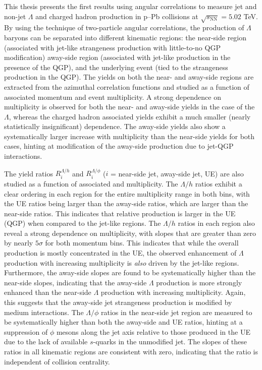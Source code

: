 This thesis presents the first results using angular correlations to measure jet and non-jet $\Lambda$ and charged hadron production in p--Pb collisions at $\sqrt{s_{\text{NN}}} = 5.02$ TeV. By using the technique of two-particle angular correlations, the production of $\Lambda$ baryons can be separated into different kinematic regions: the near-side region (associated with jet-like strangeness production with little-to-no QGP modification) away-side region (associated with jet-like production in the presence of the QGP), and the underlying event (tied to the strangeness production in the QGP). The yields on both the near- and away-side regions are extracted from the azimuthal correlation functions and studied as a function of associated momentum and event multiplicity. A strong dependence on multiplicity is observed for both the near- and away-side yields in the case of the $\Lambda$, whereas the charged hadron associated yields exhibit a much smaller (nearly statistically insignificant) dependence. The away-side yields also show a systematically larger increase with multiplicity than the near-side yields for both cases, hinting at modification of the away-side production due to jet-QGP interactions. 

The yield ratios $R_{i}^{\Lambda/h}$ and $R_{i}^{\Lambda/\phi}$ ($i$ = near-side jet, away-side jet, UE) are also studied as a function of associated \pt and multiplicity. The $\Lambda/h$ ratios exhibit a clear ordering in each region for the entire multiplicity range in both \pt bins, with the UE ratios being larger than the away-side ratios, which are larger than the near-side ratios. This indicates that relative \lmb production is larger in the UE (QGP) when compared to the jet-like regions. The $\Lambda/h$ ratios in each region also reveal a strong dependence on multiplicity, with slopes that are greater than zero by nearly $5\sigma$ for both momentum bins. This indicates that while the overall \lmb production is mostly concentrated in the UE, the observed enhancement of $\Lambda$ production with increasing multiplicity is \textit{also} driven by the jet-like regions. Furthermore, the away-side slopes are found to be systematically higher than the near-side slopes, indicating that the away-side $\Lambda$ production is more strongly enhanced than the near-side $\Lambda$ production with increasing multiplicity. Again, this suggests that the away-side jet strangeness production is modified by medium interactions. The $\Lambda/\phi$ ratios in the near-side jet region are measured to be systematically higher than both the away-side and UE ratios, hinting at a suppression of $\phi$ mesons along the jet axis relative to those produced in the UE due to the lack of available $s$-quarks in the unmodified jet. The slopes of these ratios in all kinematic regions are consistent with zero, indicating that the ratio is independent of collision centrality.

